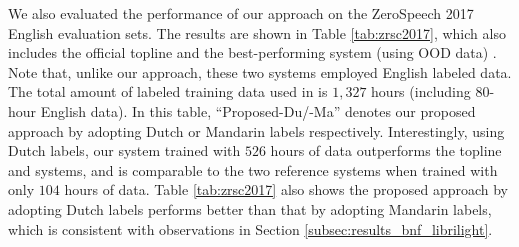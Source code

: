 \documentclass[a4paper]{article}
\begin{document}
\begin{table}[!t]
\renewcommand\arraystretch{0.65}
\centering
\caption{ABX error rates of  BNFs  on ZeroSpeech 2017 English evaluation sets. Models are trained with  Libri-light.}
\label{tab:zrsc2017}
\end{table}
We also evaluated the performance of  our approach 
on the ZeroSpeech 2017 English evaluation sets. The results are shown in Table \ref{tab:zrsc2017}, which also includes the official topline \cite{dunbar2017zero}  and the best-performing system (using OOD data) \cite{shibata2017composite}. 
Note that, unlike our approach, these two systems employed English labeled data. 
The total amount of labeled training data used in \cite{shibata2017composite} is $1,327$ hours (including $80$-hour English data).
In this table, ``Proposed-Du/-Ma'' denotes our proposed approach by adopting Dutch or Mandarin labels  respectively.
Interestingly, using Dutch labels, our system trained with $526$ hours of data outperforms the topline and \cite{shibata2017composite} systems, and is comparable to the two reference systems when trained with only $104$ hours of data. Table \ref{tab:zrsc2017} also shows the proposed approach by adopting Dutch labels performs better than that by adopting Mandarin labels,  which is consistent with observations in Section \ref{subsec:results_bnf_librilight}.
\end{document}
